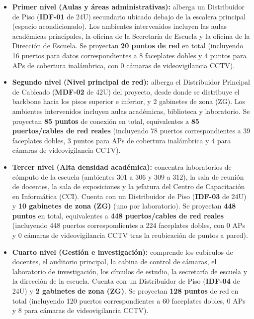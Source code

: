 \begin{itemize}
    \item \textbf{Primer nivel (Aulas y áreas administrativas):} alberga un Distribuidor de Piso (\textbf{IDF-01} de 24U) secundario ubicado debajo de la escalera principal (espacio acondicionado). Los ambientes intervenidos incluyen las aulas académicas principales, la oficina de la Secretaría de Escuela y la oficina de la Dirección de Escuela. Se proyectan \textbf{20 puntos de red} en total (incluyendo 16 puertos para datos correspondientes a 8 faceplates dobles y 4 puntos para APs de cobertura inalámbrica, con 0 cámaras de videovigilancia CCTV).
    \item \textbf{Segundo nivel (Nivel principal de red):} alberga el Distribuidor Principal de Cableado (\textbf{MDF-02} de 42U) del proyecto, desde donde se distribuye el backbone hacia los pisos superior e inferior, y 2 gabinetes de zona (ZG). Los ambientes intervenidos incluyen aulas académicas, biblioteca y laboratorio. Se proyectan \textbf{85 puntos} de conexión en total, equivalentes a \textbf{85 puertos/cables de red reales} (incluyendo 78 puertos correspondientes a 39 faceplates dobles, 3 puntos para APs de cobertura inalámbrica y 4 para cámaras de videovigilancia CCTV).
    \item \textbf{Tercer nivel (Alta densidad académica):} concentra laboratorios de cómputo de la escuela (ambientes 301 a 306 y 309 a 312), la sala de reunión de docentes, la sala de exposiciones y la jefatura del Centro de Capacitación en Informática (CCI). Cuenta con un Distribuidor de Piso (\textbf{IDF-03} de 24U) y \textbf{10 gabinetes de zona (ZG)} (uno por laboratorio). Se proyectan \textbf{448 puntos} en total, equivalentes a \textbf{448 puertos/cables de red reales} (incluyendo 448 puertos correspondientes a 224 faceplates dobles, con 0 APs y 0 cámaras de videovigilancia CCTV tras la reubicación de puntos a pared).
    \item \textbf{Cuarto nivel (Gestión e investigación):} comprende los cubículos de docentes, el auditorio principal, la cabina de control de cámaras, el laboratorio de investigación, los círculos de estudio, la secretaría de escuela y la dirección de la escuela. Cuenta con un Distribuidor de Piso (\textbf{IDF-04} de 24U) y \textbf{2 gabinetes de zona (ZG)}. Se proyectan \textbf{128 puntos} de red en total (incluyendo 120 puertos correspondientes a 60 faceplates dobles, 0 APs y 8 para cámaras de videovigilancia CCTV).
\end{itemize}

